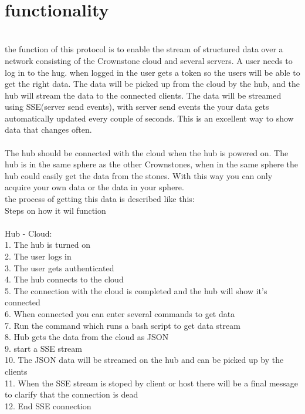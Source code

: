 \documentclass{article}
\begin{document}
\\
\section{functionality} 
 \\
the function of this protocol is to enable the stream of structured data over a network consisting of the Crownstone cloud and several servers. A user needs to log in to the hug. when logged in the user gets a token so the users will be able to get the right data. The data will be picked up from the cloud by the hub, and the hub will stream the data to the connected clients. The data will be streamed using SSE(server send events), with server send events the your data gets automatically updated  every couple of seconds. This is an excellent way to show data that changes often.\\
\\
The hub should be connected with the cloud when the hub is powered on. The hub is in the same sphere as  the other Crownstones, when in the same sphere the hub could easily get the data from the stones. With this way you can only acquire your own data or the data in your sphere.  
\\
the process of getting this data is described like this:\\
Steps on how it wil function \\
\\
Hub  - Cloud: \\
1. The hub is turned on\\
2. The user logs in\\
3. The user gets authenticated\\
4. The hub connects to the cloud\\
5. The connection with the cloud is completed and the hub will show it's connected\\
6. When connected you can enter several commands to get data\\
7. Run the command which runs a bash script to get data stream\\
8. Hub gets the data from the cloud as JSON\\
9. start a SSE stream \\
10. The JSON data will be streamed on the hub and can be picked up by the clients\\
11. When the SSE stream is stoped by client or host there will be a final message to clarify that the connection is dead\\
12. End SSE connection\\
\end{document}
